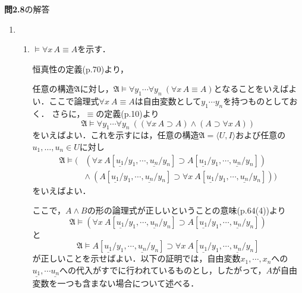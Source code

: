 \documentclass[11pt,dvipdfmx]{jreport}
\begin{document}
\noindent \textbf{問2.8}の解答 
\begin{enumerate}
 \item 
  \begin{enumerate}
   \item $\models \forall x \, A \equiv A$を示す．
    \par \noindent 
    恒真性の定義(p.70)より，
    \par \noindent 
    任意の構造$\mathfrak{A}$に対し，$\mathfrak{A} \models \forall y_{1} \cdots \forall y_{n} \ (\forall x \, A \equiv A)$となることをいえばよい．ここで論理式$\forall x \ A \equiv A$は自由変数として$y_{1} \cdots y_{n}$を持つものとしておく．
さらに，$\equiv$の定義(p.10)より
    \begin{equation*}
     \mathfrak{A} \models \forall y_{1} \cdots \forall y_{n} \ ((\forall x \, A \supset A) \land (A \supset \forall x \, A))
    \end{equation*}
    をいえばよい．これを示すには，任意の構造$\mathfrak{A} = \langle U, I \rangle$および任意の$u_{1}, \dots, u_{n} \in U$に対し
    \begin{align*}
     \mathfrak{A} \models ( & (\forall x \ A[ \underline{u_{1}} / y_{1}, \cdots , \underline{u_{n}} / y_{n}] \supset A[\underline{u_{1}}/y_{1}, \cdots , \underline{u_{n}}/y_{n}]) \\
     & \land \ (A[\underline{u_{1}}/y_{1}, \cdots , \underline{u_{n}}/y_{n}] \supset \forall x \ A[ \underline{u_{1}} / y_{1}, \cdots , \underline{u_{n}} / y_{n}]))
    \end{align*}
をいえばよい．
    \par \noindent
    ここで，$A \land B$の形の論理式が正しいということの意味(p.64(4))より
    \begin{equation*}
     \mathfrak{A} \models (\forall x \ A[ \underline{u_{1}} / y_{1}, \cdots , \underline{u_{n}} / y_{n}] \supset A[\underline{u_{1}}/y_{1}, \cdots , \underline{u_{n}}/y_{n}])
    \end{equation*}
    と
    \begin{equation*}
     \mathfrak{A} \models A[\underline{u_{1}}/y_{1}, \cdots , \underline{u_{n}}/y_{n}] \supset \forall x \ A[ \underline{u_{1}} / y_{1}, \cdots , \underline{u_{n}} / y_{n}]
    \end{equation*}
    が正しいことを示せばよい．以下の証明では，自由変数$x_{1}, \cdots, x_{n}$への$\underline{u_{1}}, \cdots \underline{u_{n}}$への代入がすでに行われているものとし，したがって，$A$が自由変数を一つも含まない場合について述べる．
    \begin{enumerate}

\end{enumerate}
\end{enumerate}
\end{enumerate}
\end{document}
